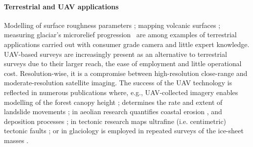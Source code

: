 \documentclass[journal]{IEEEtran}
\begin{document}
\paragraph{Terrestrial and UAV applications}
Modelling of surface roughness parameters  \cite{bretar2013advanced}; mapping volcanic surfaces \cite{kolzenburg2016rapid}; measuring glaciar's microrelief progression~\cite{kaab2014surface} are among examples of terrestrial applications carried out with consumer grade camera and little expert knowledge.
%
%
UAV-based surveys are increasingly present as an alternative to terrestrial surveys due to their larger reach, the ease of employment and little operational cost. Resolution-wise, it is a compromise between high-resolution close-range and moderate-resolution satellite imaging. The success of the UAV technology is reflected in numerous publications where, e.g., UAV-collected imagery enables modelling of the forest canopy height \cite{lisein2013photogrammetric}; determines the rate and extent of landslide movements \cite{niethammer2010uav}; in aeolian research quantifies coastal erosion \cite{d2012unmanned}, \cite{james2012straightforward} and deposition processes \cite{hugenholtz2013geomorphological}; in tectonic research maps ultrafine (i.e. centimetric) tectonic faults \cite{johnson2014rapid}; or in glaciology is employed in repeated surveys of the ice-sheet masses \cite{ryan2015uav}.


 
\end{document}
